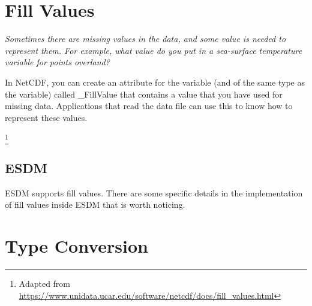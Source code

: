 
\section{Fill Values}

{\itshape
Sometimes there are missing values in the data, and some value is needed to represent them.
For example, what value do you put in a sea-surface temperature variable for points overland?

In NetCDF, you can create an attribute for the variable (and of the same type as the variable) called \_FillValue that contains a value that you have used for missing data.
Applications that read the data file can use this to know how to represent these values.
}\footnote{Adapted from \url{https://www.unidata.ucar.edu/software/netcdf/docs/fill_values.html}}

\subsection{ESDM}

ESDM supports fill values.
There are some specific details in the implementation of fill values inside ESDM that is worth noticing.


\section{Type Conversion}

